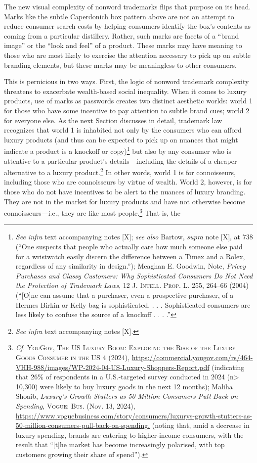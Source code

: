 \documentclass[letterpaper, 11pt, oneside]{article}
\begin{document}
The new visual complexity of nonword trademarks flips that purpose on its head. Marks like the subtle Caperdonich box pattern above are not an attempt to reduce consumer search costs by helping consumers identify the box's contents as coming from a particular distillery. Rather, such marks are facets of a ``brand image'' or the ``look and feel'' of a product. These marks may have meaning to those who are most likely to exercise the attention necessary to pick up on subtle branding elements, but these marks may be meaningless to other consumers. 

This is pernicious in two ways. First, the logic of nonword trademark complexity threatens to exacerbate wealth-based social inequality. When it comes to luxury products, use of marks as passwords creates two distinct aesthetic worlds: world 1 for those who have some incentive to pay attention to subtle brand cues; world 2 for everyone else. As the next Section discusses in detail, trademark law recognizes that world 1 is inhabited not only by the consumers who can afford luxury products (and thus can be expected to pick up on nuances that might indicate a product is a knockoff or copy)\footnote{\textit{See infra} text accompanying notes [X]; \textit{see also} Bartow, \textit{supra} note [X], at 738 (``One suspects that people who actually care how much someone else paid for a wristwatch easily discern the difference between a Timex and a Rolex, regardless of any similarity in design.''); Meaghan E. Goodwin, Note, \textit{Pricey Purchases and Classy Customers: Why Sophisticated Consumers Do Not Need the Protection of Trademark Laws}, 12 \textsc{J. Intell. Prop. L.} 255, 264–66 (2004) (``[O]ne can assume that a purchaser, even a prospective purchaser, of a Hermes Birkin or Kelly bag is sophisticated. . . . Sophisticated consumers are less likely to confuse the source of a knockoff . . . .''} but also by any consumer who is attentive to a particular product's details—including the details of a cheaper alternative to a luxury product.\footnote{\textit{See infra} text accompanying notes [X].} In other words, world 1 is for connoisseurs, including those who are connoisseurs by virtue of wealth. World 2, however, is for those who do not have incentives to be alert to the nuances of luxury branding. They are not in the market for luxury products and have not otherwise become connoisseurs—i.e., they are like most people.\footnote{\textit{Cf.} \textsc{YouGov, The US Luxury Boom: Exploring the Rise of the Luxury Goods Consumer in the US} 4 (2024), \url{https://commercial.yougov.com/rs/464-VHH-988/images/WP-2024-04-US-Luxury-Shoppers-Report.pdf} (indicating that 26\% of respondents in a U.S.-targeted survey conducted in 2024 (n> 10,300) were likely to buy luxury goods in the next 12 months); Maliha Shoaib, \textit{Luxury’s Growth Stutters as 50 Million Consumers Pull Back on Spending}, \textsc{Vogue: Bus.} (Nov. 13, 2024), \url{https://www.voguebusiness.com/story/consumers/luxurys-growth-stutters-as-50-million-consumers-pull-back-on-spending.} (noting that, amid a decrease in luxury spending, brands are catering to higher-income consumers, with the result that ``[t]he market has become increasingly polarised, with top customers growing their share of spend'').} That is, the 
\end{document}
